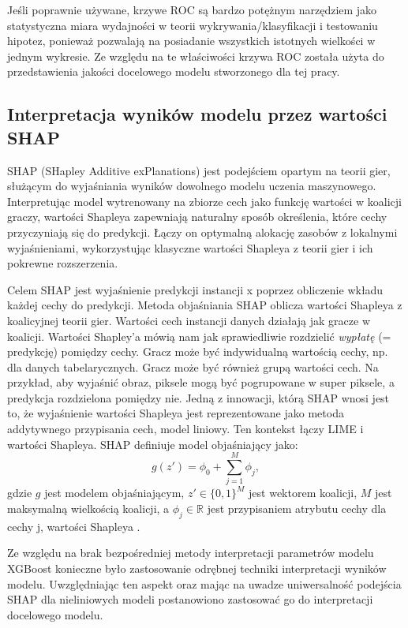 \documentclass[polish, twoside, 12pt, a4paper]{article}
\theoremstyle{definition}
\theoremstyle{plain}
\theoremstyle{remark}
\begin{document}
Jeśli poprawnie używane, krzywe ROC są bardzo potężnym narzędziem jako statystyczna miara wydajności w teorii wykrywania/klasyfikacji i testowaniu hipotez, ponieważ pozwalają na posiadanie wszystkich istotnych wielkości w jednym wykresie. Ze względu na te właściwości krzywa ROC została użyta do przedstawienia jakości docelowego modelu stworzonego dla tej pracy.

\subsection{Interpretacja wyników modelu przez wartości SHAP}

SHAP (SHapley Additive exPlanations) jest podejściem opartym na teorii gier, służącym do wyjaśniania wyników dowolnego modelu uczenia maszynowego. Interpretując model wytrenowany na zbiorze cech jako funkcję wartości w koalicji graczy, wartości Shapleya zapewniają naturalny sposób określenia, które cechy przyczyniają się do predykcji. Łączy on optymalną alokację zasobów z lokalnymi wyjaśnieniami, wykorzystując klasyczne wartości Shapleya z teorii gier i ich pokrewne rozszerzenia.


Celem SHAP jest wyjaśnienie predykcji instancji x poprzez obliczenie wkładu każdej cechy do predykcji. Metoda objaśniania SHAP oblicza wartości Shapleya z koalicyjnej teorii gier. Wartości cech instancji danych działają jak gracze w koalicji. Wartości Shapley'a mówią nam jak sprawiedliwie rozdzielić \emph{wypłatę} (= predykcję) pomiędzy cechy. Gracz może być indywidualną wartością cechy, np. dla danych tabelarycznych. Gracz może być również grupą wartości cech. Na przykład, aby wyjaśnić obraz, piksele mogą być pogrupowane w super piksele, a predykcja rozdzielona pomiędzy nie. Jedną z innowacji, którą SHAP wnosi jest to, że wyjaśnienie wartości Shapleya jest reprezentowane jako metoda addytywnego przypisania cech, model liniowy. Ten kontekst łączy LIME i wartości Shapleya. SHAP definiuje model objaśniający jako:
\[ g(z') =  \phi_0 + \sum_{j=1}^{M}\phi_j, \]
gdzie \(g\) jest modelem objaśniającym, \( z'\in\{0,1\}^{M}\)  jest wektorem koalicji, \(M\) jest maksymalną wielkością koalicji, a \( \phi_j \in\mathbb{R}\) jest przypisaniem atrybutu cechy dla cechy j, wartości Shapleya \citep{lundberg2017}.

Ze względu na brak bezpośredniej metody interpretacji parametrów modelu XGBoost konieczne było zastosowanie odrębnej techniki interpretacji wyników modelu. Uwzględniając ten aspekt oraz mając na uwadze uniwersalność podejścia SHAP dla nieliniowych modeli postanowiono zastosować go do interpretacji docelowego modelu.
\end{document}

